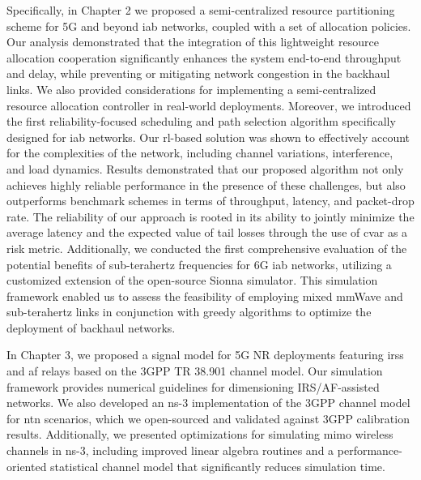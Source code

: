 Specifically, in Chapter 2 we proposed a semi-centralized resource partitioning scheme for 5G and beyond \gls{iab} networks, coupled with a set of allocation policies. Our analysis demonstrated that the integration of this lightweight resource allocation cooperation significantly enhances the system end-to-end throughput and delay, while preventing or mitigating network congestion in the backhaul links. We also provided considerations for implementing a semi-centralized resource allocation controller in real-world deployments. 
Moreover, we introduced the first reliability-focused scheduling and path selection algorithm specifically designed for \gls{iab} networks. Our \gls{rl}-based solution was shown to effectively account for the complexities of the network, including channel variations, interference, and load dynamics. Results demonstrated that our proposed algorithm not only achieves highly reliable performance in the presence of these challenges, but also outperforms benchmark schemes in terms of throughput, latency, and packet-drop rate. The reliability of our approach is rooted in its ability to jointly minimize the average latency and the expected value of tail losses through the use of \gls{cvar} as a risk metric.
Additionally, we conducted the first comprehensive evaluation of the potential benefits of sub-terahertz frequencies for 6G \gls{iab} networks, utilizing a customized extension of the open-source Sionna simulator. This simulation framework enabled us to assess the feasibility of employing mixed mmWave and sub-terahertz links in conjunction with greedy algorithms to optimize the deployment of backhaul networks.

In Chapter 3, we proposed a signal model for 5G NR deployments featuring \glspl{irs} and \gls{af} relays based on the 3GPP TR 38.901 channel model. Our simulation framework provides numerical guidelines for dimensioning IRS/AF-assisted networks. We also developed an ns-3 implementation of the 3GPP channel model for \gls{ntn} scenarios, which we open-sourced and validated against 3GPP calibration results. Additionally, we presented optimizations for simulating \gls{mimo} wireless channels in ns-3, including improved linear algebra routines and a performance-oriented statistical channel model that significantly reduces simulation time.

